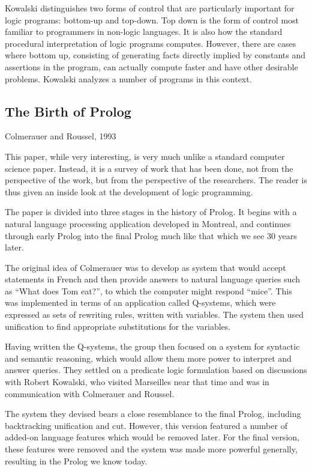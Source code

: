 \documentclass[12pt]{article}
\begin{document}
Kowalski distinguishes two forms of control that are particularly
important for logic programs: bottom-up and top-down. Top down is the
form of control most familiar to programmers in non-logic languages.
It is also how the standard procedural interpretation of logic
programs computes.  However, there are cases where bottom up,
consisting of generating facts directly implied by constants and
assertions in the program, can actually compute faster and have other
desirable problems.  Kowalski analyzes a number of programs in this
context.  

\subsection*{The Birth of Prolog}
Colmerauer and Roussel, 1993 \cite{col93}

This paper, while very interesting, is very much unlike a standard
computer science paper.  Instead, it is a survey of work that has been
done, not from the perspective of the work, but from the perspective
of the researchers.  The reader is thus given an inside look at the
development of logic programming.  

The paper is divided into three stages in the history of Prolog.  It
begins with a natural language processing application developed in
Montreal, and continues through early Prolog into the final Prolog
much like that which we see 30 years later.  

The original idea of Colmerauer was to develop as system that would
accept statements in French and then provide answers to natural
language queries such as ``What does Tom eat?'', to which the computer
might respond ``mice''.  This was implemented in terms of an
application called Q-systems, which were expressed as sets of
rewriting rules, written with variables.  The system then used
unification to find appropriate substitutions for the variables.  

Having written the Q-systems, the group then focused on a system for
syntactic and semantic reasoning, which would allow them more power to
interpret and answer queries.  They settled on a predicate logic
formulation based on discussions with Robert Kowalski, who visited
Marseilles near that time and was in communication with Colmerauer and
Roussel.  

The system they devised bears a close resemblance to the final Prolog,
including backtracking unification and cut.  However, this version
featured a number of added-on language features which would be removed
later.  For the final version, these features were removed and the
system was made more powerful generally, resulting in the Prolog we
know today.  


\end{document}
